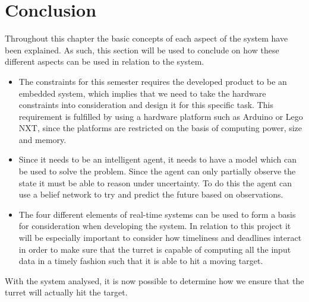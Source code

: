 \section{Conclusion}\label{EmbConc}

Throughout this chapter the basic concepts of each aspect of the system have
been explained. As such, this section will be used to conclude on how these
different aspects can be used in relation to the \name system.

\begin{itemize}
  \item The constraints for this semester requires the developed product to be
  an embedded system, which implies that we need to take the hardware
  constraints into consideration and design it for this specific task. This
  requirement is fulfilled by using a hardware platform such as Arduino or Lego
  NXT, since the platforms are restricted on the basis of computing power, size
  and memory.
  \item Since it needs to be an intelligent agent, it needs to have a model
  which can be used to solve the problem. Since the agent can only partially
  observe the state it must be able to reason under uncertainty. To do this the
  agent can use a belief network to try and predict the future based on
  observations.
  \item The four different elements of real-time systems can be used to form a
  basis for consideration when developing the system. In relation to this
  project it will be especially important to consider how timeliness and
  deadlines interact in order to make sure that the turret is capable of
  computing all the input data in a timely fashion such that it is able to hit a
  moving target.
\end{itemize}  

With the system analysed, it is now possible to determine how we ensure that
the turret will actually hit the target.


% 
